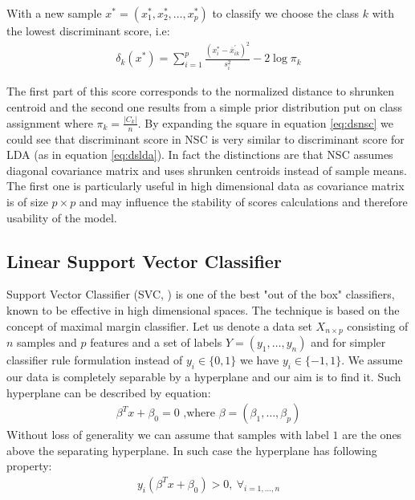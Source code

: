 \documentclass[shortabstract, english, mgr]{iithesis}
\begin{document}
With a new sample $x^{*}=\left(x_{1}^{*}, x_{2}^{*}, \ldots, x_{p}^{*}\right)$ to classify we choose the class $k$ with the lowest discriminant score, i.e:
\begin{align}
\delta_{k}\left(x^{*}\right)=\sum_{i=1}^{p}\frac{\left(x_{i}^{*}-\overline{x}_{ik}^{\prime}\right)^{2}}{s_{i}^{2}}-2 \log \pi_{k} \label{eq:dsnsc}
\end{align}

The first part of this score corresponds to the normalized distance to shrunken centroid and the second one results from a simple prior distribution put on class assignment where $\pi_{k} = \frac{|C_k|}{n}$. By expanding the square in equation \ref{eq:dsnsc} we could see that discriminant score in NSC is very similar to discriminant score for LDA (as in equation \ref{eq:dslda}). In fact the distinctions are that NSC assumes diagonal covariance matrix and uses shrunken centroids instead of sample means. The first one is particularly useful in high dimensional data as covariance matrix is of size $p \times p$ and may influence the stability of scores calculations and therefore usability of the model.

\subsection{Linear Support Vector Classifier}

Support Vector Classifier (SVC, \cite[chapter 9]{ISL}) is one of the best "out of the box" classifiers, known to be effective in high dimensional spaces. The technique is based on the concept of maximal margin classifier. Let us denote a data set $X_{n \times p}$ consisting of $n$ samples and $p$ features and a set of labels $Y = (y_1, \ldots, y_n)$ and for simpler classifier rule formulation instead of $y_i \in \{0,1\}$ we have $y_i \in \{-1, 1\}$. We assume our data is completely separable by a hyperplane and our aim is to find it. Such hyperplane can be described by equation:
\begin{align*}
    \beta^T x + \beta_0 = 0 \text{ ,where $\beta = (\beta_1, \ldots, \beta_p)$}
\end{align*}
Without loss of generality we can assume that samples with label $1$ are the ones above the separating hyperplane. In such case the hyperplane has following property:
\begin{align*}
    y_i(\beta^T x + \beta_0) > 0, \ \forall_{i=1, \ldots, n}
\end{align*}
\end{document}
